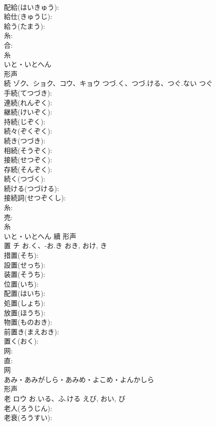 \documentclass[8pt]{extreport}
\begin{document}
\begin{CJK}{UTF8}{min}
\\	配給(はいきゅう): 
\\	給仕(きゅうじ): 
\\	給う(たまう): 
\\	糸: 
\\	合: 
\\	糸	
\\	いと・いとへん	
\\	形声 
\\	続	ゾク、ショク、コウ、キョウ	つづ.く、つづ.ける、つぐ.ない	つぐ	
\\	手続(てつづき): 
\\	連続(れんぞく): 
\\	継続(けいぞく): 
\\	持続(じぞく): 
\\	続々(ぞくぞく): 
\\	続き(つづき): 
\\	相続(そうぞく): 
\\	接続(せつぞく): 
\\	存続(そんぞく): 
\\	続く(つづく): 
\\	続ける(つづける): 
\\	接続詞(せつぞくし): 
\\	糸: 
\\	売: 
\\	糸	
\\	いと・いとへん	續	形声 
\\	置	チ	お.く、-お.き	おき, おけ, き	
\\	措置(そち): 
\\	設置(せっち): 
\\	装置(そうち): 
\\	位置(いち): 
\\	配置(はいち): 
\\	処置(しょち): 
\\	放置(ほうち): 
\\	物置(ものおき): 
\\	前置き(まえおき): 
\\	置く(おく): 
\\	网: 
\\	直: 
\\	网	
\\	あみ・あみがしら・あみめ・よこめ・よんかしら	
\\	形声 
\\	老	ロウ	お.いる、ふ.ける	えび, おい, び	
\\	老人(ろうじん): 
\\	老衰(ろうすい): 

\end{CJK}
\end{document}
